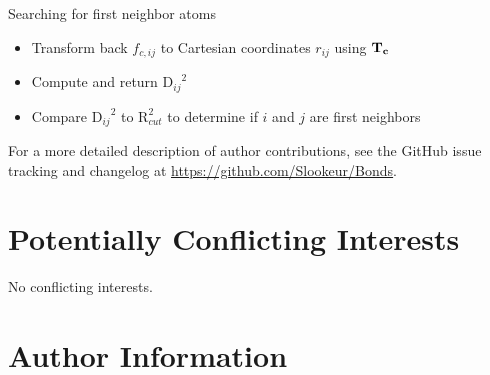 \documentclass[9pt,tutorial]{livecoms}
\newcommand{\githubrepository}{\url{https://github.com/Slookeur/Bonds}}  %
\newcommand{\Tc}{{\text{\bf{T}}_{\bf{c}}}}
\newcommand{\Rc}{\text{R}_{cut}}
\newcommand{\Dij}{{\text{D}_{ij}}}
\begin{document}
\begin{Checklists*}[h]
\begin{checklist}{Searching for first neighbor atoms}
\begin{itemize}
\begin{itemize}
\begin{itemize}
\begin{itemize}
\item Transform back $f_{c,ij}$ to Cartesian coordinates $r_{ij}$ using $\Tc$
\item Compute and return $\Dij^2$
\item Compare $\Dij^2$ to $\Rc^2$ to determine if $i$ and $j$ are first neighbors
\end{itemize}
\end{itemize}
\end{itemize}
\end{itemize}
\end{checklist}

\end{Checklists*}

%

For a more detailed description of author contributions,
see the GitHub issue tracking and changelog at \githubrepository.
\section*{Potentially Conflicting Interests}


No conflicting interests.

\section*{Author Information}
\makeorcid



\clearpage
\appendix

\onecolumn




\clearpage

\twocolumn
\end{document}
